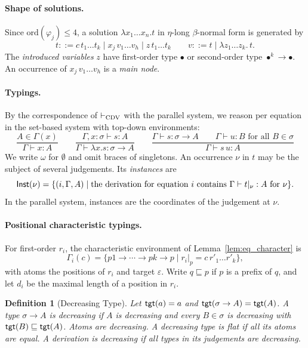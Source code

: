 \documentclass[10pt,a4paper]{article}
\theoremstyle{plain}%
\newtheorem{definition}[theorem]{Definition}
\begin{document}
\paragraph{Shape of solutions.}
Since $\mathrm{ord}(\varphi_j) \le 4$, a solution $\lambda x_1\ldots x_n.t$ in $\eta$-long $\beta$-normal form is generated by
\[
t ::= c\,t_1\ldots t_k \mid x_j\,v_1\ldots v_h \mid z\,t_1\ldots t_k
\qquad
v ::= t \mid \lambda z_1\ldots z_k.\,t .
\]
The \emph{introduced variables} $z$ have first-order type $\bullet$ or second-order type $\bullet^k \to \bullet$.
An occurrence of $x_j\,v_1\ldots v_h$ is a \emph{main node}.

\paragraph{Typings.}
By the correspondence of $\vdash_{\textnormal{CDV}}$ with the parallel system, we reason per equation in the set-based system with top-down environments:
\[
\frac{A \in \Gamma(x)}{\Gamma \vdash x : A}
\qquad
\frac{\Gamma, x : \sigma \vdash s : A}{\Gamma \vdash \lambda x.s : \sigma \to A}
\qquad
\frac{\Gamma \vdash s : \sigma \to A \qquad \Gamma \vdash u : B \text{ for all } B \in \sigma}{\Gamma \vdash s\,u : A}
\]
We write $\omega$ for $\emptyset$ and omit braces of singletons.
An occurrence $\nu$ in $t$ may be the subject of several judgements.
Its \emph{instances} are
\[
\mathsf{Inst}(\nu) = \{(i,\Gamma,A) \mid \text{the derivation for equation } i \text{ contains } \Gamma \vdash t|_\nu : A \text{ for } \nu\}.
\]
In the parallel system, instances are the coordinates of the judgement at $\nu$.

\paragraph{Positional characteristic typings.}
For first-order $r_i$, the characteristic environment of Lemma~\ref{lem:eq_character} is
\[
\Gamma_i(c) = \{p1 \to \cdots \to pk \to p \mid r_i|_p = c\,r'_1\ldots r'_k\},
\]
with atoms the positions of $r_i$ and target $\varepsilon$.
Write $q \sqsubseteq p$ if $p$ is a prefix of $q$, and let $d_i$ be the maximal length of a position in $r_i$.

\begin{definition}[Decreasing Type]
Let $\mathsf{tgt}(a) = a$ and $\mathsf{tgt}(\sigma \to A) = \mathsf{tgt}(A)$.
A type $\sigma \to A$ is \emph{decreasing} if $A$ is decreasing and every $B \in \sigma$ is decreasing with $\mathsf{tgt}(B) \sqsubseteq \mathsf{tgt}(A)$.
Atoms are decreasing.
A decreasing type is \emph{flat} if all its atoms are equal.
A derivation is decreasing if all types in its judgements are decreasing.
\end{definition}
\end{document}
